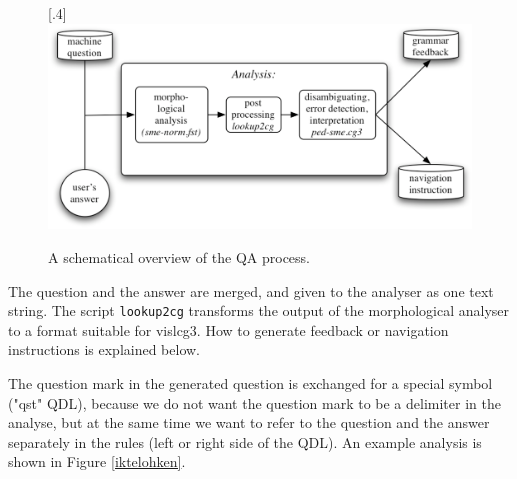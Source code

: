 \documentclass[a4paper,12pt]{article}
\begin{document}
\begin{figure}[htbp]
\begin{center}
\scalebox{.4}[.4]{\includegraphics{img/qa.pdf}}
\caption{A schematical overview of the QA process.}
\label{fafdfsa}
\end{center}
\end{figure}

The question and the answer are merged, and given to the analyser as one text string. The script \texttt{lookup2cg} transforms the output of the morphological analyser to a format suitable for vislcg3. How to generate feedback or navigation instructions is explained below.

The question mark in the generated question is exchanged for a special symbol ("qst" QDL), because we do not want the question mark to be a delimiter in the analyse, but at the same time we want to refer to the question and the answer separately in the rules (left or right side of the QDL). An example analysis is shown in Figure \ref{iktelohken}.
\end{document}

